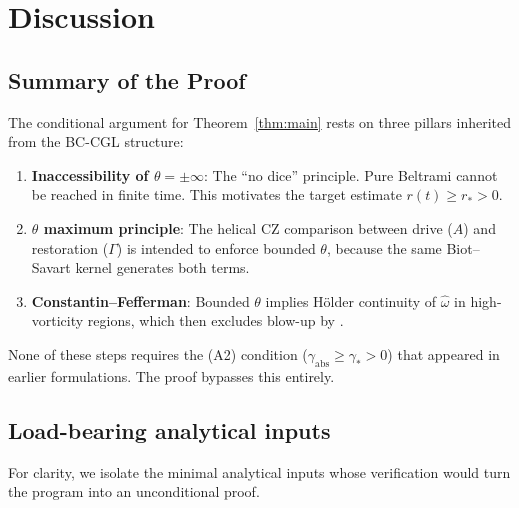 \documentclass[12pt,a4paper]{article}
\theoremstyle{definition}
\begin{document}
\section{Discussion}\label{sec:discussion}

\subsection{Summary of the Proof}

The conditional argument for Theorem~\ref{thm:main} rests on three pillars inherited from the BC-CGL structure:

\begin{enumerate}
  \item \textbf{Inaccessibility of $\theta = \pm\infty$}: The ``no dice'' principle. Pure Beltrami cannot be reached in finite time. This motivates the target estimate $r(t) \geq r_* > 0$.
  \item \textbf{$\theta$ maximum principle}: The helical CZ comparison between drive ($A$) and restoration ($\Gamma$) is intended to enforce bounded $\theta$, because the same Biot--Savart kernel generates both terms.
  \item \textbf{Constantin--Fefferman}: Bounded $\theta$ implies H\"older continuity of $\hat{\omega}$ in high-vorticity regions, which then excludes blow-up by \cite{CF93}.
\end{enumerate}

None of these steps requires the (A2) condition ($\gamma_{\mathrm{abs}} \geq \gamma_* > 0$) that appeared in earlier formulations. The proof bypasses this entirely.

\subsection{Load-bearing analytical inputs}

For clarity, we isolate the minimal analytical inputs whose verification would turn the program into an unconditional proof.
\end{document}
